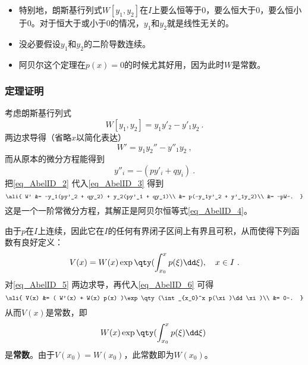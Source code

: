 \begin{itemize}
\item 特别地，朗斯基行列式$W[y_1, y_2]$在$I$上要么恒等于$0$，要么恒大于$0$，要么恒小于$0$。对于恒大于或小于$0$的情况，$y_1$和$y_2$就是线性无关的。
\item 没必要假设$y_1$和$y_2$的二阶导数连续。
\item 阿贝尔这个定理在$p(x)=0$的时候尤其好用，因为此时$W$是常数。
\end{itemize}


\subsubsection{定理证明}

考虑朗斯基行列式
\begin{equation}
W[y_1, y_2] = y_1y'_2 - y'_1y_2~.
\end{equation}
两边求导得（省略$x$以简化表达）
\begin{equation}\label{eq_AbelID_3}
W' = y_1y_2'' - y''_1y_2~,
\end{equation}
而从原本的微分方程能得到
\begin{equation}\label{eq_AbelID_2}
y''_i = -(py'_i+qy_i)~.
\end{equation}
把\autoref{eq_AbelID_2} 代入\autoref{eq_AbelID_3} 得到
\begin{equation}\label{eq_AbelID_6}
\ali{
    W' &= -y_1(py'_2 + qy_2) + y_2(py'_1 + qy_1)\\
    &= p(-y_1y'_2 + y'_1y_2)\\
    &= -pW~.
}
\end{equation}
这是一个一阶常微分方程，其解正是阿贝尔恒等式\autoref{eq_AbelID_4}。

由于$p$在$I$上连续，因此它在$I$的任何有界闭子区间上有界且可积，从而使得下列函数有良好定义：
\begin{equation}\label{eq_AbelID_5}
V(x) = W(x) \exp\qty(\int_{x_0}^x p(\xi)\dd \xi),\quad x\in I~.
\end{equation}
对\autoref{eq_AbelID_5} 两边求导，再代入\autoref{eq_AbelID_6} 可得
\begin{equation}
\ali{
    V(x) &= ( W'(x) + W(x) p(x) )\exp\qty(\int_{x_0}^x p(\xi)\dd \xi)\\
    &= 0~.
}
\end{equation}
从而$V(x)$是常数，即
\begin{equation}
W(x)\exp\qty(\int_{x_0}^x p(\xi)\dd \xi)~
\end{equation}
是\textbf{常数}。由于$V(x_0)=W(x_0)$，此常数即为$W(x_0)$。


